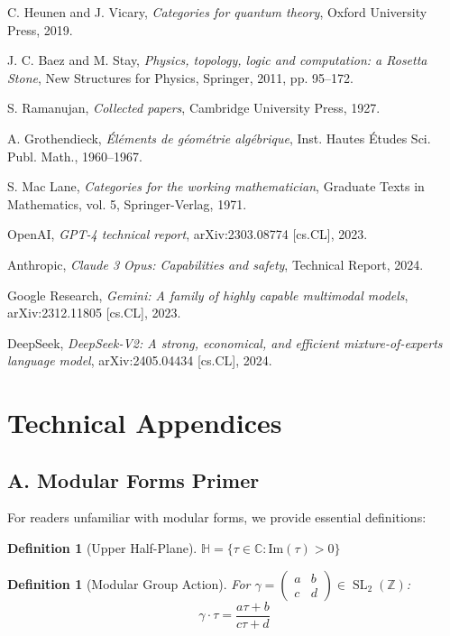 \documentclass[12pt,a4paper]{article}
\newtheorem{definition}[theorem]{Definition}
\DeclareMathOperator{\SL}{SL}
\begin{document}
\begin{thebibliography}{99}
C. Heunen and J. Vicary,
\textit{Categories for quantum theory},
Oxford University Press, 2019.

J. C. Baez and M. Stay,
\textit{Physics, topology, logic and computation: a Rosetta Stone},
New Structures for Physics, Springer, 2011, pp. 95--172.

S. Ramanujan,
\textit{Collected papers},
Cambridge University Press, 1927.

A. Grothendieck,
\textit{\'El\'ements de g\'eom\'etrie alg\'ebrique},
Inst. Hautes \'Etudes Sci. Publ. Math., 1960--1967.

S. Mac Lane,
\textit{Categories for the working mathematician},
Graduate Texts in Mathematics, vol. 5, Springer-Verlag, 1971.

OpenAI,
\textit{GPT-4 technical report},
arXiv:2303.08774 [cs.CL], 2023.

Anthropic,
\textit{Claude 3 Opus: Capabilities and safety},
Technical Report, 2024.

Google Research,
\textit{Gemini: A family of highly capable multimodal models},
arXiv:2312.11805 [cs.CL], 2023.

DeepSeek,
\textit{DeepSeek-V2: A strong, economical, and efficient mixture-of-experts language model},
arXiv:2405.04434 [cs.CL], 2024.

\end{thebibliography}

\appendix

\section{Technical Appendices}

\subsection{A. Modular Forms Primer}

For readers unfamiliar with modular forms, we provide essential definitions:

\begin{definition}[Upper Half-Plane]
$\mathbb{H} = \{\tau \in \mathbb{C} : \text{Im}(\tau) > 0\}$
\end{definition}

\begin{definition}[Modular Group Action]
For $\gamma = \begin{pmatrix} a & b \\ c & d \end{pmatrix} \in \SL_2(\mathbb{Z})$:
\[
\gamma \cdot \tau = \frac{a\tau + b}{c\tau + d}
\]
\end{definition}
\end{document}
